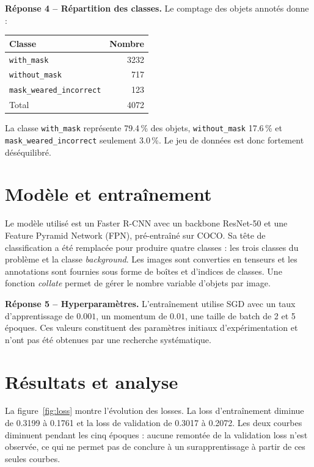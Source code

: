 \documentclass[12pt,a4paper]{article}
\begin{document}
\textbf{Réponse 4 -- Répartition des classes.}
Le comptage des objets annotés donne :

\begin{center}
\begin{tabular}{l r}
\toprule
Classe & Nombre \\
\midrule
\texttt{with\_mask} & 3232 \\
\texttt{without\_mask} & 717 \\
\texttt{mask\_weared\_incorrect} & 123 \\
\midrule
Total & 4072 \\
\bottomrule
\end{tabular}
\end{center}

La classe \texttt{with\_mask} représente 79.4\,\% des objets,
\texttt{without\_mask} 17.6\,\% et
\texttt{mask\_weared\_incorrect} seulement 3.0\,\%. Le jeu de données
est donc fortement déséquilibré.

\section{Modèle et entraînement}

Le modèle utilisé est un Faster R-CNN avec un backbone ResNet-50 et une
Feature Pyramid Network (FPN), pré-entraîné sur COCO. Sa tête de
classification a été remplacée pour produire quatre classes : les
trois classes du problème et la classe \textit{background}. Les images
sont converties en tenseurs et les annotations sont fournies sous forme
de boîtes et d'indices de classes. Une fonction \textit{collate}
permet de gérer le nombre variable d'objets par image.

\textbf{Réponse 5 -- Hyperparamètres.}
L'entraînement utilise SGD avec un taux d'apprentissage de $0.001$,
un momentum de $0.01$, une taille de batch de 2 et 5 époques. Ces
valeurs constituent des paramètres initiaux d'expérimentation et n'ont
pas été obtenues par une recherche systématique.

\section{Résultats et analyse}

La figure~\ref{fig:loss} montre l'évolution des losses. La loss
d'entraînement diminue de 0.3199 à 0.1761 et la loss de validation de
0.3017 à 0.2072. Les deux courbes diminuent pendant les cinq époques :
aucune remontée de la validation loss n'est observée, ce qui ne permet
pas de conclure à un surapprentissage à partir de ces seules courbes.
\end{document}
